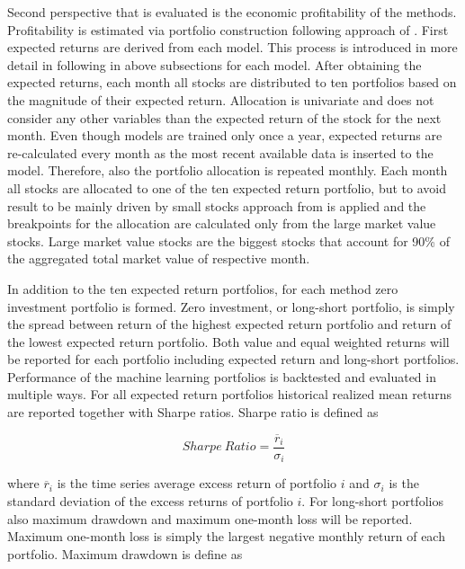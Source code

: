 \documentclass[12pt]{article}
\begin{document}
Second perspective that is evaluated is the economic profitability of the methods. Profitability is estimated via portfolio construction following approach of \citet{Lewellen2015}. First expected returns are derived from each model. This process is introduced in more detail in following in above subsections for each model. After obtaining the expected returns, each month all stocks are distributed to ten portfolios based on the magnitude of their expected return. Allocation is univariate and does not consider any other variables than the expected return of the stock for the next month. Even though models are trained only once a year, expected returns are re-calculated every month as the most recent available data is inserted to the model. Therefore, also the portfolio allocation is repeated monthly. Each month all stocks are allocated to one of the ten expected return portfolio, but to avoid result to be mainly driven by small stocks approach from \citet{HANAUER2023} is applied and the breakpoints for the allocation are calculated only from the large market value stocks. Large market value stocks are the biggest stocks that account for 90\% of the aggregated total market value of respective month. \par

In addition to the ten expected return portfolios, for each method zero investment portfolio is formed. Zero investment, or long-short portfolio, is simply the spread between return of the highest expected return portfolio and return of the lowest expected return portfolio. Both value and equal weighted returns will be reported for each portfolio including expected return and long-short portfolios. Performance of the machine learning portfolios is backtested and evaluated in multiple ways. For all expected return portfolios historical realized mean returns are reported together with Sharpe ratios. Sharpe ratio is defined as

\begin{equation}
\label{eq:SharpeRatio}
Sharpe \ Ratio = \frac{\overline{r}_i}{\sigma_i}
\end{equation}

where $\overline{r}_i$ is the time series average excess return of portfolio $i$ and $\sigma_i$ is the standard deviation of the excess returns of portfolio $i$. For long-short portfolios also maximum drawdown and maximum one-month loss will be reported. Maximum one-month loss is simply the largest negative monthly return of each portfolio. Maximum drawdown is define as \par
\end{document}
